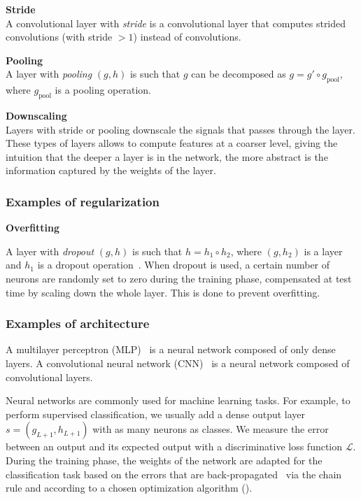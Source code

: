 \begin{definition}\textbf{Stride}\\
A convolutional layer with \emph{stride} is a convolutional layer that computes strided convolutions (with stride $> 1$) instead of convolutions.
\end{definition}

\begin{definition}\textbf{Pooling}\\
A layer with \textit{pooling} $(g,h)$ is such that $g$ can be decomposed as $g = g' \circ g_\text{pool}$, where $g_\text{pool}$ is a pooling operation.
\end{definition}

\begin{remark}\textbf{Downscaling}\\
Layers with stride or pooling downscale the signals that passes through the layer. These types of layers allows to compute features at a coarser level, giving the intuition that the deeper a layer is in the network, the more abstract is the information captured by the weights of the layer.
\end{remark}


\subsubsection{Examples of regularization}

\begin{remark}\textbf{Overfitting}
\todo{}
\end{remark}

A layer with \textit{dropout} $(g,h)$ is such that $h = h_1 \circ h_2$, where $(g,h_2)$ is a layer and $h_1$ is a dropout operation~\citep{srivastava2014dropout}. When dropout is used, a certain number of neurons are randomly set to zero during the training phase, compensated at test time by scaling down the whole layer. This is done to prevent overfitting.

\subsubsection{Examples of architecture}
\label{sec:nn_arch}


A multilayer perceptron (MLP)~\citep{hornik1989multilayer} is a neural network composed of only dense layers.
A convolutional neural network (CNN)~\citep{lecun1998gradient} is a neural network composed of convolutional layers.

Neural networks are commonly used for machine learning tasks. For example, to perform supervised classification, we usually add a dense output layer $s=(g_{L+1},h_{L+1})$ with as many neurons as classes. We measure the error between an output and its expected output with a discriminative loss function $\mathcal{L}$. During the training phase, the weights of the network are adapted for the classification task based on the errors that are back-propagated~\citep{hornik1989multilayer} via the chain rule and according to a chosen optimization algorithm (\eg \cite{bottou2010large}).
